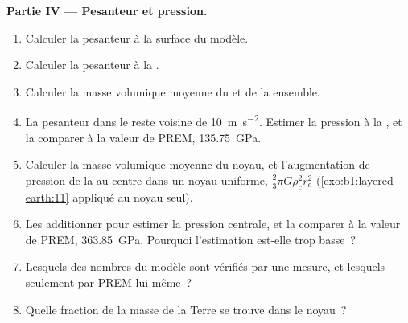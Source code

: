 \begin{problem}
\noindent\textbf{Partie IV --- Pesanteur et pression.}
\begin{enumerate}[resume]
  \item Calculer la pesanteur à la surface du modèle.
  \item Calculer la pesanteur à la .
  \item Calculer la masse volumique moyenne du  et de la  ensemble.
  \item La pesanteur dans le  reste voisine de \qty{10}{m.s^{-2}}. Estimer
        la pression à la , et la comparer à la valeur de
        PREM, \qty{135.75}{GPa}.
  \item Calculer la masse volumique moyenne du noyau, et l'augmentation de
        pression de la  au centre dans un noyau uniforme,
        $\tfrac23\pi G\rho_c^2 r_c^2$ (\cref{exo:b1:layered-earth:11} appliqué au
        noyau seul).
  \item Les additionner pour estimer la pression centrale, et la comparer à la
        valeur de PREM, \qty{363.85}{GPa}. Pourquoi l'estimation est-elle trop
        basse~?
  \item Lesquels des nombres du modèle sont vérifiés par une mesure, et lesquels
        seulement par PREM lui-même~?
  \item Quelle fraction de la masse de la Terre se trouve dans le noyau~?
\end{enumerate}
\end{problem}
